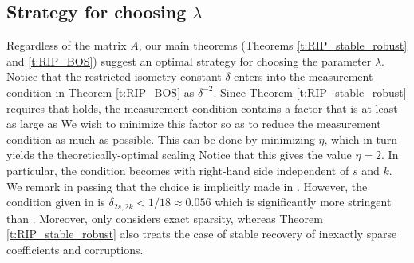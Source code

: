 \documentclass[10.5pt]{article}
\begin{document}




\subsection{Strategy for choosing $\lambda$}\label{ss:lambda-strategy}
Regardless of the matrix $A$, our main theorems (Theorems \ref{t:RIP_stable_robust} and \ref{t:RIP_BOS}) suggest an optimal strategy for choosing the parameter $\lambda$.  Notice that the restricted isometry constant $\delta$ enters into the measurement condition in Theorem \ref{t:RIP_BOS} as $\delta^{-2}$.  Since Theorem \ref{t:RIP_stable_robust} requires that  holds, the measurement condition contains a factor that is at least as large as 
We wish to minimize this factor so as to reduce the measurement condition as much as possible.
This can be done by minimizing $\eta$, which in turn yields the theoretically-optimal scaling
Notice that this gives the value $\eta = 2$.  In particular, the condition  becomes
with right-hand side independent of $s$ and $k$.  We remark in passing that the choice  is implicitly made in \cite{LiCorruptionsConstrApprox}.  However, the condition given in \cite[Lem.\ 2.3]{LiCorruptionsConstrApprox} is $\delta_{2s,2k} < 1/18 \approx 0.056$  which is significantly more stringent than .  Moreover, \cite{LiCorruptionsConstrApprox} only considers exact sparsity, whereas Theorem \ref{t:RIP_stable_robust} also treats the case of stable recovery of inexactly sparse coefficients and corruptions.
\end{document}

